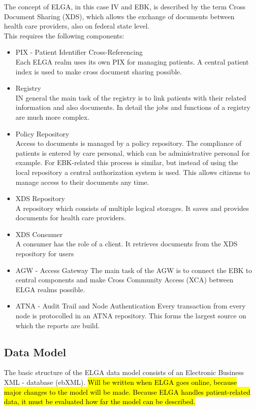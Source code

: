 \documentclass[a4paper]{article}
\begin{document}
	The concept of ELGA, in this case IV and EBK, is described by the term Cross Document Sharing
	(XDS), which allows the exchange of documents between health care providers,
	also on federal state level.\\
	This requires the following components:\\
	\begin{itemize}
	    	\item PIX - Patient Identifier Cross-Referencing\\
	    	Each ELGA realm uses its own PIX for managing patients. A central patient index is used to
	    	make cross document sharing possible.
	    	\item Registry\\
	    	IN general the main task of the registry is to link patients with their related information and also documents.
	    	In detail the jobs and functions of a registry are much more complex.
	    	\item Policy Repository\\
	    	Access to documents is managed  by a policy repository. The compliance of patients is entered
	    	by care personal, which can be administrative personal for example. For
	    	EBK-related this process is similar, but instead of using the local repository a central authorization system is used. This allows citizens to manage access to their documents
	    	any time.
	    	\item XDS Repository\\
	    	A repository which consists of multiple logical storages. It saves and provides documents
	    	for health care providers.
	    	\item XDS Consumer\\
	    	A consumer has the role of a client. It retrieves documents from the XDS repository for users 
	    	\item AGW - Access Gateway
	    	The main task of the AGW is to connect the EBK to central components and
	    	make Cross Community Access (XCA) between ELGA realms possible.
	    	\item ATNA - Audit Trail and Node Authentication
	    	Every transaction from every node is protocolled in an ATNA repository.
	    	This forms the largest source on which the reports are build.
	    	
	 \end{itemize}
	
	
	
	\subsection{Data Model}
	The basic structure of the ELGA data model consists of an Electronic Business
	XML - database (ebXML).
	\hl{Will be written when ELGA goes online, because major
	changes to the model will be made.
	Because ELGA handles patient-related data, it must be evaluated how far the
	model can be described.}
\end{document}
